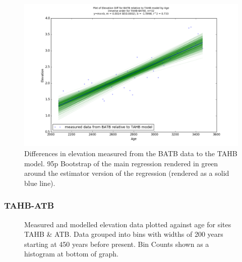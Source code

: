\begin{figure}[H]
	\includegraphics[width=1.7\linewidth, angle=270 ]{data/bothNonZero/withinSeventyFivePercent/gias/theGIA_BATB_relative_to_TAHB.png}
	\caption{Differences in elevation measured from the BATB data to the TAHB model. 95p Bootstrap of the main regression rendered in green around the estimator version of the regression (rendered as a solid blue line).}
	\label{fig:gias_BATBxTAHB}
\end{figure}
\newpage






\subsubsection{TAHB-ATB}

\begin{figure}[H]
	\caption{Measured and modelled elevation data plotted against age for sites TAHB \& ATB. Data grouped into bins with widths of 200 years starting at 450 years before present. Bin Counts shown as a histogram at bottom of graph.}	
	\label{fig:data_TAHBxATB}
\end{figure}

